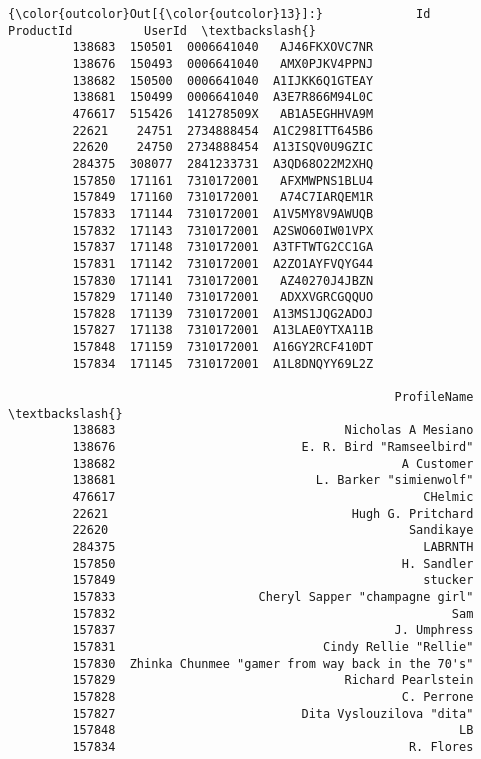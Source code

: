 \documentclass[11pt]{article}
\begin{document}
\begin{Verbatim}[commandchars=\\\{\}]
{\color{outcolor}Out[{\color{outcolor}13}]:}             Id   ProductId          UserId  \textbackslash{}
         138683  150501  0006641040   AJ46FKXOVC7NR   
         138676  150493  0006641040   AMX0PJKV4PPNJ   
         138682  150500  0006641040  A1IJKK6Q1GTEAY   
         138681  150499  0006641040  A3E7R866M94L0C   
         476617  515426  141278509X   AB1A5EGHHVA9M   
         22621    24751  2734888454  A1C298ITT645B6   
         22620    24750  2734888454  A13ISQV0U9GZIC   
         284375  308077  2841233731  A3QD68O22M2XHQ   
         157850  171161  7310172001   AFXMWPNS1BLU4   
         157849  171160  7310172001   A74C7IARQEM1R   
         157833  171144  7310172001  A1V5MY8V9AWUQB   
         157832  171143  7310172001  A2SWO60IW01VPX   
         157837  171148  7310172001  A3TFTWTG2CC1GA   
         157831  171142  7310172001  A2ZO1AYFVQYG44   
         157830  171141  7310172001   AZ40270J4JBZN   
         157829  171140  7310172001   ADXXVGRCGQQUO   
         157828  171139  7310172001  A13MS1JQG2ADOJ   
         157827  171138  7310172001  A13LAE0YTXA11B   
         157848  171159  7310172001  A16GY2RCF410DT   
         157834  171145  7310172001  A1L8DNQYY69L2Z   
         
                                                      ProfileName  \textbackslash{}
         138683                                Nicholas A Mesiano   
         138676                          E. R. Bird "Ramseelbird"   
         138682                                        A Customer   
         138681                            L. Barker "simienwolf"   
         476617                                           CHelmic   
         22621                                  Hugh G. Pritchard   
         22620                                          Sandikaye   
         284375                                           LABRNTH   
         157850                                        H. Sandler   
         157849                                           stucker   
         157833                    Cheryl Sapper "champagne girl"   
         157832                                               Sam   
         157837                                       J. Umphress   
         157831                             Cindy Rellie "Rellie"   
         157830  Zhinka Chunmee "gamer from way back in the 70's"   
         157829                                Richard Pearlstein   
         157828                                        C. Perrone   
         157827                          Dita Vyslouzilova "dita"   
         157848                                                LB   
         157834                                         R. Flores   
         

\end{Verbatim}
\end{document}
